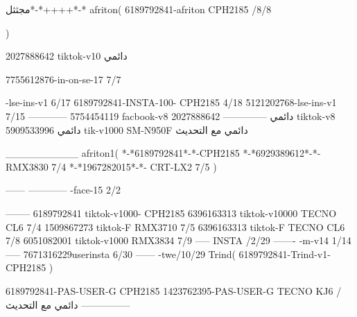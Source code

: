 مجثثل*-*++++*-*
afriton(
6189792841-afriton CPH2185  /8/8

)

2027888642 tiktok-v10
دائمي

7755612876-in-on-se-17 7/7

-lse-ins-v1 6/17
6189792841-INSTA-100- CPH2185 4/18
5121202768-lse-ins-v1 7/15
------------
5754454119 facbook-v8
دائمي
--------------
2027888642 tiktok-v8
دائمي
5909533996 tik-v1000  SM-N950F
دائمي مع التحديث

__________
afriton1(
*-*6189792841*-*-CPH2185
*-*6929389612*-*-  RMX3830  7/4
*-*1967282015*-*-  CRT-LX2  7/5
)


------
------------
-face-15 2/2

--------
6189792841 tiktok-v1000- CPH2185 
6396163313 tiktok-v10000 TECNO CL6  7/4
1509867273 tiktok-F RMX3710  7/5
6396163313 tiktok-F TECNO CL6  7/8
6051082001 tiktok-v1000 RMX3834  7/9
-----
 INSTA /2/29
-------
-m-v14 1/14
-----
7671316229userinsta 6/30
------
-twe/10/29
Trind(
6189792841-Trind-v1- CPH2185 
)


6189792841-PAS-USER-G CPH2185 
1423762395-PAS-USER-G TECNO KJ6  /دائمي مع التحديث
    ---------------

